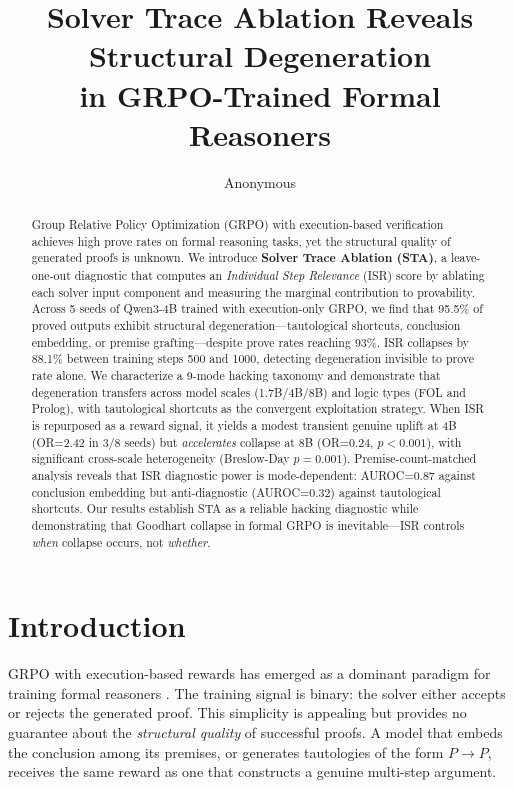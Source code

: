 \documentclass[11pt,a4paper]{article}
\title{Solver Trace Ablation Reveals Structural Degeneration\\in GRPO-Trained Formal Reasoners}
\author{Anonymous}
\date{}
\begin{document}
\maketitle

\begin{abstract}
Group Relative Policy Optimization (GRPO) with execution-based verification achieves high prove rates on formal reasoning tasks, yet the structural quality of generated proofs is unknown.
We introduce \textbf{Solver Trace Ablation (STA)}, a leave-one-out diagnostic that computes an \emph{Individual Step Relevance} (ISR) score by ablating each solver input component and measuring the marginal contribution to provability.
Across 5 seeds of Qwen3-4B trained with execution-only GRPO, we find that 95.5\% of proved outputs exhibit structural degeneration---tautological shortcuts, conclusion embedding, or premise grafting---despite prove rates reaching 93\%.
ISR collapses by 88.1\% between training steps 500 and 1000, detecting degeneration invisible to prove rate alone.
We characterize a 9-mode hacking taxonomy and demonstrate that degeneration transfers across model scales (1.7B/4B/8B) and logic types (FOL and Prolog), with tautological shortcuts as the convergent exploitation strategy.
When ISR is repurposed as a reward signal, it yields a modest transient genuine uplift at 4B (OR=2.42 in 3/8 seeds) but \emph{accelerates} collapse at 8B (OR=0.24, $p<0.001$), with significant cross-scale heterogeneity (Breslow-Day $p=0.001$).
Premise-count-matched analysis reveals that ISR diagnostic power is mode-dependent: AUROC=0.87 against conclusion embedding but anti-diagnostic (AUROC=0.32) against tautological shortcuts.
Our results establish STA as a reliable hacking diagnostic while demonstrating that Goodhart collapse in formal GRPO is inevitable---ISR controls \emph{when} collapse occurs, not \emph{whether}.
\end{abstract}

\section{Introduction}

GRPO with execution-based rewards has emerged as a dominant paradigm for training formal reasoners \citep{shao2024deepseekprover,xin2024deepseekproverv15}.
The training signal is binary: the solver either accepts or rejects the generated proof.
This simplicity is appealing but provides no guarantee about the \emph{structural quality} of successful proofs.
A model that embeds the conclusion among its premises, or generates tautologies of the form $P \to P$, receives the same reward as one that constructs a genuine multi-step argument.
\end{document}
